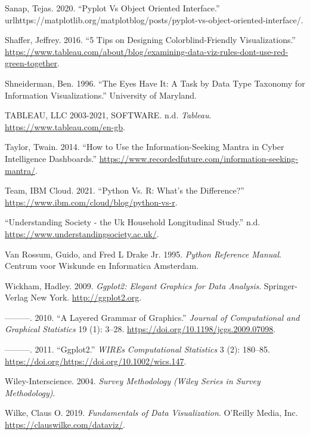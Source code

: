 \documentclass[
  11pt,
]{book}
\begin{document}
\leavevmode\hypertarget{ref-matplotblog}{}%
Sanap, Tejas. 2020. ``Pyplot Vs Object Oriented Interface.''
urlhttps://matplotlib.org/matplotblog/posts/pyplot-vs-object-oriented-interface/.

\leavevmode\hypertarget{ref-colourb}{}%
Shaffer, Jeffrey. 2016. ``5 Tips on Designing Colorblind-Friendly
Visualizations.''
\url{https://www.tableau.com/about/blog/examining-data-viz-rules-dont-use-red-green-together}.

\leavevmode\hypertarget{ref-taxonomy}{}%
Shneiderman, Ben. 1996. ``The Eyes Have It: A Task by Data Type Taxonomy
for Information Visualizations.'' University of Maryland.

\leavevmode\hypertarget{ref-tableau}{}%
TABLEAU, LLC 2003-2021, SOFTWARE. n.d. \emph{Tableau}.
\url{https://www.tableau.com/en-gb}.

\leavevmode\hypertarget{ref-taylor2014}{}%
Taylor, Twain. 2014. ``How to Use the Information-Seeking Mantra in
Cyber Intelligence Dashboards.''
\url{https://www.recordedfuture.com/information-seeking-mantra/}.

\leavevmode\hypertarget{ref-rvpy}{}%
Team, IBM Cloud. 2021. ``Python Vs. R: What's the Difference?''
\url{https://www.ibm.com/cloud/blog/python-vs-r}.

\leavevmode\hypertarget{ref-longitudinal}{}%
``Understanding Society - the Uk Household Longitudinal Study.'' n.d.
\url{https://www.understandingsociety.ac.uk/}.

\leavevmode\hypertarget{ref-py}{}%
Van Rossum, Guido, and Fred L Drake Jr. 1995. \emph{Python Reference
Manual}. Centrum voor Wiskunde en Informatica Amsterdam.

\leavevmode\hypertarget{ref-ggplot}{}%
Wickham, Hadley. 2009. \emph{Ggplot2: Elegant Graphics for Data
Analysis}. Springer-Verlag New York. \url{http://ggplot2.org}.

\leavevmode\hypertarget{ref-layered-grammar}{}%
---------. 2010. ``A Layered Grammar of Graphics.'' \emph{Journal of
Computational and Graphical Statistics} 19 (1): 3--28.
\url{https://doi.org/10.1198/jcgs.2009.07098}.

\leavevmode\hypertarget{ref-ggplot2}{}%
---------. 2011. ``Ggplot2.'' \emph{WIREs Computational Statistics} 3
(2): 180--85. \url{https://doi.org/https://doi.org/10.1002/wics.147}.

\leavevmode\hypertarget{ref-wiley2004}{}%
Wiley-Interscience. 2004. \emph{Survey Methodology (Wiley Series in
Survey Methodology)}.

\leavevmode\hypertarget{ref-wilke2019}{}%
Wilke, Claus O. 2019. \emph{Fundamentals of Data Visualization}.
O'Reilly Media, Inc. \url{https://clauswilke.com/dataviz/}.
\end{document}

